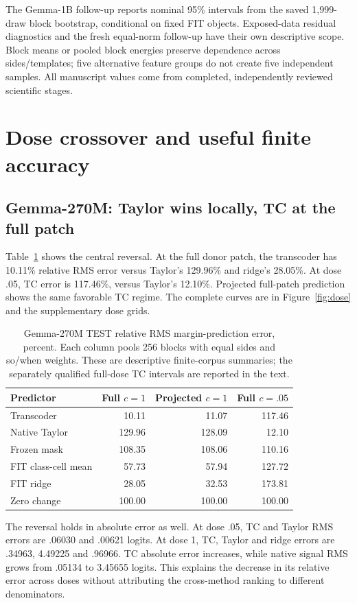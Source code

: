 \documentclass[11pt]{article}
\begin{document}
The Gemma-1B follow-up reports nominal 95\% intervals from the saved 1,999-draw block bootstrap, conditional on fixed FIT objects. Exposed-data residual diagnostics and the fresh equal-norm follow-up have their own descriptive scope. Block means or pooled block energies preserve dependence across sides/templates; five alternative feature groups do not create five independent samples. All manuscript values come from completed, independently reviewed scientific stages.

\section{Dose crossover and useful finite accuracy}
\subsection{Gemma-270M: Taylor wins locally, TC at the full patch}
Table~\ref{tab:main} shows the central reversal. At the full donor patch, the transcoder has 10.11\% relative RMS error versus Taylor's 129.96\% and ridge's 28.05\%. At dose .05, TC error is 117.46\%, versus Taylor's 12.10\%. Projected full-patch prediction shows the same favorable TC regime. The complete curves are in Figure~\ref{fig:dose} and the supplementary dose grids.

\begin{table}[ht]\centering\small
\begin{tabular}{lrrr}\toprule Predictor & Full $c=1$ & Projected $c=1$ & Full $c=.05$\\\midrule
Transcoder & 10.11 & 11.07 & 117.46\\
Native Taylor & 129.96 & 128.09 & 12.10\\
Frozen mask & 108.35 & 108.06 & 110.16\\
FIT class-cell mean & 57.73 & 57.94 & 127.72\\
FIT ridge & 28.05 & 32.53 & 173.81\\
Zero change & 100.00 & 100.00 & 100.00\\\bottomrule\end{tabular}
\caption{Gemma-270M TEST relative RMS margin-prediction error, percent. Each column pools 256 blocks with equal sides and so/when weights. These are descriptive finite-corpus summaries; the separately qualified full-dose TC intervals are reported in the text.}\label{tab:main}
\end{table}

The reversal holds in absolute error as well. At dose .05, TC and Taylor RMS errors are .06030 and .00621 logits. At dose 1, TC, Taylor and ridge errors are .34963, 4.49225 and .96966. TC absolute error increases, while native signal RMS grows from .05134 to 3.45655 logits. This explains the decrease in its relative error across doses without attributing the cross-method ranking to different denominators.
\end{document}
